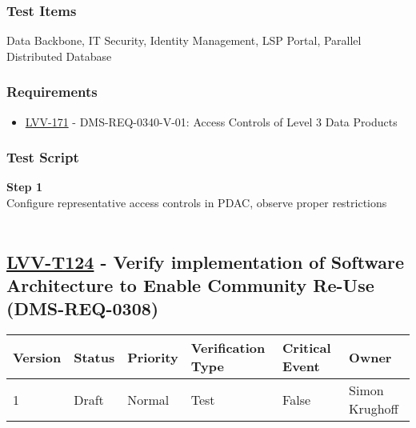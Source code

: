 \hypertarget{test-items-99}{%
\subsubsection{Test Items}\label{test-items-99}}

Data Backbone, IT Security, Identity Management, LSP Portal, Parallel
Distributed Database~

\hypertarget{requirements-100}{%
\subsubsection{Requirements}\label{requirements-100}}

\begin{itemize}
\tightlist
\item
  \href{https://jira.lsstcorp.org/browse/LVV-171}{LVV-171} -
  DMS-REQ-0340-V-01: Access Controls of Level 3 Data Products
\end{itemize}

\hypertarget{test-script-100}{%
\subsubsection{Test Script}\label{test-script-100}}

\textbf{Step 1}\\
Configure representative access controls in PDAC, observe proper
restrictions\\
~\\

\hypertarget{lvv-t124---verify-implementation-of-software-architecture-to-enable-community-re-use-dms-req-0308}{%
\subsection{\texorpdfstring{\href{https://jira.lsstcorp.org/secure/Tests.jspa\#/testCase/LVV-T124}{LVV-T124}
- Verify implementation of Software Architecture to Enable Community
Re-Use
(DMS-REQ-0308)}{LVV-T124 - Verify implementation of Software Architecture to Enable Community Re-Use (DMS-REQ-0308)}}\label{lvv-t124---verify-implementation-of-software-architecture-to-enable-community-re-use-dms-req-0308}}

\begin{longtable}[]{@{}llllll@{}}
\toprule
Version & Status & Priority & Verification Type & Critical Event &
Owner\tabularnewline
\midrule
\endhead
1 & Draft & Normal & Test & False & Simon Krughoff\tabularnewline
\bottomrule
\end{longtable}

